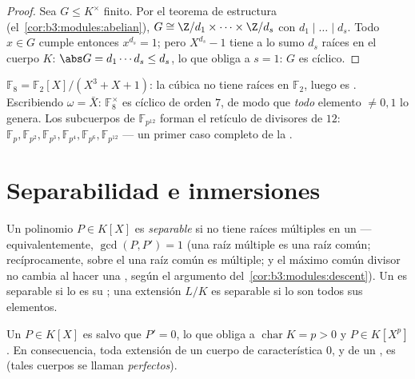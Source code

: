 \begin{proof}
Sea $G \leq K^\times$ finito. Por el teorema de estructura
(el~\cref{cor:b3:modules:abelian}), $G \cong \Z/d_1 \times \dots
\times \Z/d_s$ con $d_1 \mid \dots \mid d_s$. Todo $x \in G$ cumple
entonces $x^{d_s} = 1$; pero $X^{d_s} - 1$ tiene a lo sumo $d_s$ raíces
en el cuerpo $K$: $\abs G = d_1\cdots d_s \leq d_s$, lo que obliga a
$s = 1$: $G$ es cíclico.
\end{proof}

\begin{example}\label{ex:b3:galois:f8}
$\mathbb F_8 = \mathbb F_2[X]/(X^3 + X + 1)$: la cúbica no tiene raíces
en $\mathbb F_2$, luego es
. Escribiendo $\omega =
\bar X$: $\mathbb F_8^\times$ es cíclico de orden $7$, de modo que
\emph{todo} elemento $\neq 0, 1$ lo genera. Los subcuerpos de
$\mathbb F_{p^{12}}$ forman el retículo de divisores de $12$:
$\mathbb F_p, \mathbb F_{p^2}, \mathbb F_{p^3}, \mathbb F_{p^4},
\mathbb F_{p^6}, \mathbb F_{p^{12}}$ --- un primer caso completo de la
.
\end{example}

\section{Separabilidad e inmersiones}

\begin{definition}\label{def:b3:galois:separable}
Un polinomio $P \in K[X]$ es \emph{separable}
si no tiene raíces múltiples en un
 ---
equivalentemente, $\gcd(P, P') = 1$ (una raíz múltiple es una raíz
común; recíprocamente, sobre el  una raíz común es múltiple; y el máximo común divisor
no cambia al hacer una , según el argumento del~\cref{cor:b3:modules:descent}). Un
 es separable si lo
es su ; una extensión
$L/K$ es separable si lo son todos sus elementos.
\end{definition}

\begin{proposition}\label{prop:b3:galois:perfect}
Un $P \in K[X]$ \emph{}
es  salvo que $P' = 0$, lo
que obliga a $\operatorname{char} K = p > 0$ y $P \in K[X^p]$. En
consecuencia, toda extensión
 de un cuerpo de
característica $0$, y de un , es  (tales cuerpos
se llaman \emph{perfectos}).
\end{proposition}

